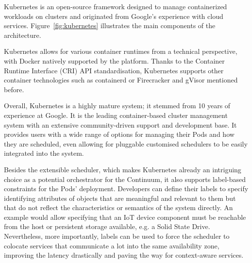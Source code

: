 Kubernetes \cite{kubernetes} is an open-source framework designed to manage containerized workloads on clusters and originated from Google's experience with cloud services. Figure~\ref{fig:kubernetes} illustrates the main components of the architecture.


Kubernetes allows for various container runtimes from a technical perspective, with Docker natively supported by the platform. Thanks to the Container Runtime Interface (CRI) API standardisation, Kubernetes supports other container technologies such as containerd \cite{containerd} or Firecracker and gVisor mentioned before.


Overall, Kubernetes is a highly mature system; it stemmed from 10 years of experience at Google. It is the leading container-based cluster management system with an extensive community-driven support and development base. It provides users with a wide range of options for managing their Pods and how they are scheduled, even allowing for pluggable customised schedulers to be easily integrated into the system.

Besides the extensible scheduler, which makes Kubernetes already an intriguing choice as a potential orchestrator for the Continuum, it also supports label-based constraints for the Pods' deployment. Developers can define their labels to specify identifying attributes of objects that are meaningful and relevant to them but that do not reflect the characteristics or semantics of the system directly. An example would allow specifying that an IoT device component must be reachable from the host or persistent storage available, e.g. a Solid State Drive. Nevertheless, more importantly, labels can be used to force the scheduler to colocate services that communicate a lot into the same availability zone, improving the latency drastically and paving the way for context-aware services. %

